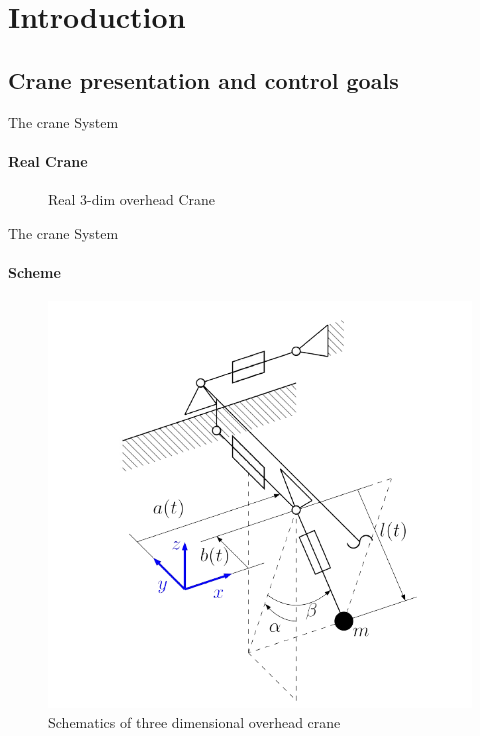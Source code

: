 
\section{Introduction}

\subsection{Crane presentation and control goals}

\begin{frame}{The crane System}
\framesubtitle{Real Crane}
\begin{figure}
    \centering
    \caption{Real 3-dim overhead Crane}
\end{figure}
\end{frame}



\begin{frame}{The crane System}
\framesubtitle{Scheme}
    \begin{figure}
        \centering
        \includegraphics[width=0.5\linewidth]{imgs/Crane/3DimCranSchem.PNG}
        \caption{Schematics of three dimensional overhead crane \cite{Knierim2010Crane}}
        \label{fig:Schematics of three dimensional overhead crane}
    \end{figure}
\end{frame}

